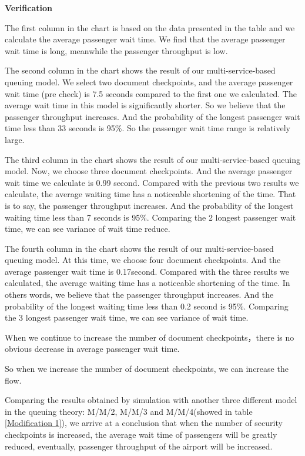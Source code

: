 \documentclass{mcmthesis}
\begin{document}
\par \textbf{Verification}
\par The first column in the chart is based on the data presented in the table and we calculate the average passenger wait time. We find that the average passenger wait time is long, meanwhile the passenger throughput is low.
\par The second column in the chart shows the result of our multi-service-based queuing model. We select two document checkpoints, and the average passenger wait time (pre check) is 7.5 seconds compared to the first one we calculated. The average wait time in this model is significantly shorter. So we believe that the passenger throughput increases. And the probability of the longest passenger wait time less than 33 seconds is 95\%. So the passenger wait time range is relatively large.
\par The third column in the chart shows the result of our multi-service-based queuing model. Now, we choose three document checkpoints. And the average passenger wait time we calculate is 0.99 second. Compared with the previous two results we calculate, the average waiting time has a noticeable shortening of the time. That is to say, the passenger throughput increases. And the probability of the longest waiting time less than 7 seconds is 95\%. Comparing the 2 longest passenger wait time, we can see variance of wait time reduce.
\par The fourth column in the chart shows the result of our multi-service-based queuing model. At this time, we choose four document checkpoints. And the average passenger wait time is 0.17second. Compared with the three results we calculated, the average waiting time has a noticeable shortening of the time. In others words, we believe that the passenger throughput increases. And the probability of the longest waiting time less than 0.2 second is 95\%. Comparing the 3 longest passenger wait time, we can see variance of wait time.
\par When we continue to increase the number of document checkpoints，there is no obvious decrease in average passenger wait time. 
\par So when we increase the number of document checkpoints, we can increase the flow.
\par Comparing the results obtained by simulation with another three different model in the queuing theory: M/M/2, M/M/3 and M/M/4(showed in table \ref{Modification 1}), we arrive at a conclusion that when the number of security checkpoints is increased, the average wait time of passengers will be greatly reduced, eventually, passenger throughput of the airport will be increased. 
\end{document}
